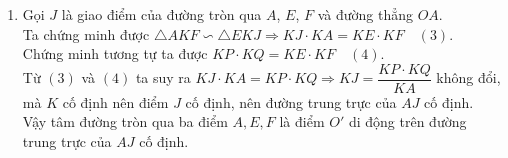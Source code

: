 \begin{bt}
{\begin{enumerate}
\begin{enumerate}[1)]
				Ta chứng minh được $\triangle AQF \backsim \triangle ACP \Rightarrow \dfrac{AQ}{AC} = \dfrac{AF}{AP} \Rightarrow AQ \cdot AP = AF \cdot AC \quad (1)$.\\
				Chứng minh tương tự $\triangle AKF \backsim \triangle ACD \Rightarrow  AK \cdot AD = AF \cdot AC \quad (2)$. \\
				Từ $(1)$ và $(2)$ suy ra $AK \cdot AD = AQ \cdot AP \Rightarrow AK = \dfrac{AQ\cdot AP}{AD} = \dfrac{R \cdot 3R}{\dfrac{5R}{2}} = \dfrac{6R}{5}.$ \\
				Vậy $AK = \dfrac{6R}{5}.$
				\item Gọi $J$ là giao điểm của đường tròn qua $A$, $E$, $F$ và đường thẳng $OA$.\\
				Ta chứng minh được $\triangle AKF \backsim \triangle EKJ \Rightarrow KJ \cdot KA = KE \cdot KF \quad (3)$.\\
				Chứng minh tương tự ta được $KP \cdot KQ = KE \cdot KF \quad (4)$.\\
				Từ $(3)$ và $(4)$ ta suy ra $KJ \cdot KA = KP \cdot KQ \Rightarrow KJ = \dfrac{KP\cdot KQ}{KA}$ không đổi, mà $K$ cố định nên điểm $J$ cố định, nên đường trung trực của $AJ$ cố định.\\
				Vậy tâm đường tròn qua ba điểm $A, E, F$ là điểm $O'$ di động trên đường trung trực của $AJ$ cố định. 
				
			\end{enumerate}
		\end{enumerate}
	}
\end{bt}


